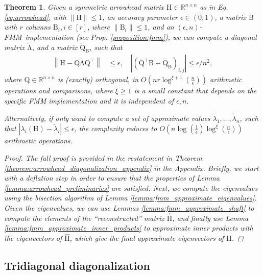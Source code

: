 \documentclass{article}
\newcommand{\labs}{\left|}
\newcommand{\rabs}{\right|}
\newcommand{\lnorm}{\left\|}
\newcommand{\rnorm}{\right\|}
\newcommand{\lpar}{\left(}
\newcommand{\rpar}{\right)}
\newtheorem{theorem}{Theorem}[section]
\newcommand\matB{\boldsymbol{\mathrm{B}}}
\newcommand\matH{\boldsymbol{\mathrm{H}}}
\newcommand\matQ{\boldsymbol{\mathrm{Q}}}
\newcommand\matQtilde{\widetilde{\boldsymbol{\mathrm{Q}}}}
\newcommand\matLambdatilde{\widetilde{\boldsymbol{\mathrm{\Lambda}}}}
\newcommand\matHhat{\widehat{\boldsymbol{\mathrm{H}}}}
\newcommand{\cfmm}{\xi}
\newcommand{\fmmalgo}{FMM} \usepackage[utf8]{inputenc}
\begin{document}
\begin{theorem}
    \label{theorem:arrowhead_diagonalization}
    Given a symmetric arrowhead matrix $\matH\in\mathbb{R}^{n\times n}$ as in Eq. \eqref{eq:arrowhead}, with $\|\matH\|\leq 1$, an accuracy parameter $\epsilon\in(0,1)$, a matrix $\matB$ with $r$ columns $\matB_i,i\in[r]$, where $\|\matB_i\|\leq 1$, and an $(\epsilon,n)$-\fmmalgo\   implementation (see Prop. \ref{proposition:fmm}), we can compute a diagonal matrix $\matLambdatilde$, and a matrix
    $\matQtilde_{\matB}$, such that 
    \begin{align*}
        \lnorm \matH-\matQ\matLambdatilde\matQ^\top \rnorm &\leq \epsilon,
        \quad
        \labs \lpar \matQ^\top\matB - \matQtilde_{\matB} \rpar_{i,j}\rabs \leq  \epsilon/n^2,
    \end{align*}
    where 
    $
        \matQ\in\mathbb{R}^{n\times n}
    $ is (exactly) orthogonal, in 
    $
        O\lpar nr\log^{\cfmm+1}(\tfrac{n}{\epsilon})\rpar
    $
    arithmetic operations and comparisons, where $\xi\geq 1$ is a small constant that depends on the specific FMM implementation and it is independent of $\epsilon,n$.

    Alternatively, if only want to compute a set of approximate values $\widetilde\lambda_1,\ldots,\widetilde\lambda_n$, such that $|\lambda_i(\matH)-\widetilde\lambda_i|\leq \epsilon$, the complexity reduces to $O\lpar n\log(\frac{1}{\epsilon})\log^{\cfmm}(\frac{n}{\epsilon})\rpar$ arithmetic operations.
    \begin{proof}
        The full proof is provided in the restatement in Theorem \ref{theorem:arrowhead_diagonalization_appendix} in the Appendix. Briefly, we start with a deflation step in order to ensure that the properties of Lemma \ref{lemma:arrowhead_preliminaries} are satisfied. Next, we compute the eigenvalues using the bisection algorithm of Lemma \ref{lemma:fmm_approximate_eigenvalues}. Given the eigenvalues, we can use Lemmas \ref{lemma:fmm_approximate_shaft} to compute the elements of the ``reconstructed'' matrix $\matHhat$, and finally use Lemma \ref{lemma:fmm_approximate_inner_products} to approximate inner products with the eigenvectors of $\matHhat$, which give the final approximate eigenvectors of $\matH$.
    \end{proof}
\end{theorem}


\subsection{Tridiagonal diagonalization}
\label{section:proof_of_tridiagonal_diagonalization}
\end{document}
